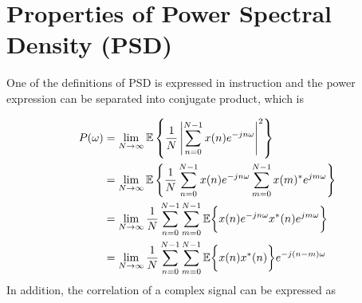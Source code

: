 \section{Properties of Power Spectral Density (PSD)}
One of the definitions of PSD is expressed in instruction and the power expression can be separated into conjugate product,  which is

\begin{align}
P(\omega) & = \lim\limits_{N \to \infty} \mathbb{E} \left\{ \frac{1}{N} \left| \sum_{n=0}^{N-1} x(n) e^{-j n \omega} \right|^2 \right\}\label{proof:periodogram:starter}\\
& = \lim\limits_{N \to \infty} \mathbb{E} \left\{ \frac{1}{N} \sum_{n=0}^{N-1} x(n) e^{-j n \omega} \sum_{m=0}^{N-1} x(m)^\ast e^{j m \omega}  \right\} \notag\\
& =\lim\limits_{N \to \infty} \frac{1}{N} \sum_{n=0}^{N-1} \sum_{m=0}^{N-1} \mathbb{E} \bigg \{  x(n)e^{-j n \omega}  x^*(n)e^{j m \omega}\bigg\}\notag\\
& =\lim\limits_{N \to \infty} \frac{1}{N} \sum_{n=0}^{N-1} \sum_{m=0}^{N-1}	\mathbb{E} \bigg \{  x(n) x^*(n)\bigg\}e^{-j(n-m)\omega}
\label{proof:periodogram}
\end{align}
In addition, the correlation of a complex signal can be expressed as

